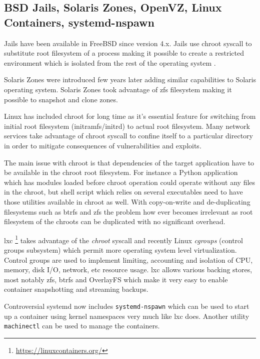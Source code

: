 \documentclass[a4paper,11pt]{kth-mag}
\begin{document}
\subsection{BSD Jails, Solaris Zones, OpenVZ, Linux Containers, systemd-nspawn}

Jails have been available in FreeBSD since version 4.x. Jails use chroot
syscall to substitute root filesystem of a process making it possible to
create a restricted environment which is isolated from the rest of the
operating system
\cite{jail}.

Solaris Zones were introduced few years later adding similar
capabilities to Solaris operating system.
Solaris Zones took advantage of \acrshort{zfs} filesystem making it
possible to snapshot and clone zones.

Linux has included chroot for long time as it's essential feature for switching from initial root filesystem (initramfs/initrd) to actual root filesystem.
Many network services take advantage of chroot syscall to confine
itself to a particular directory in order to mitigate consequences
of vulnerabilities and exploits.

The main issue with chroot is that dependencies of the target
application have to be available in the chroot root filesystem.
For instance a Python application which has modules loaded before
chroot operation could operate without any files in the chroot,
but shell script which relies on several executables need to have
those utilities available in chroot as well.
With copy-on-write and de-duplicating filesystems such as
\acrshort{btrfs} and
\acrshort{zfs} the problem how ever becomes irrelevant as root
filesystem of the chroots can be duplicated with no significant overhead.



\acrfull{lxc}
\footnote{\url{https://linuxcontainers.org/}}
takes advantage of the \emph{chroot} syscall and
recently Linux \emph{cgroups} (control groups subsystem) which permit
more  operating system level virtualization.
Control groups are used to implement limiting, accounting
and isolation of CPU, memory, disk I/O, network, etc resource usage.
\acrshort{lxc} allows various backing stores, most notably \acrshort{zfs}, \acrshort{btrfs} and
OverlayFS which make it very easy to enable container
snapshotting and streaming backups.

Controversial systemd now includes \lstinline!systemd-nspawn!
which can be used to start up a container using kernel namespaces
very much like \acrshort{lxc} does. Another utility \lstinline!machinectl!
can be used to manage the containers.
\cite{systemd-nspawn}
\end{document}
